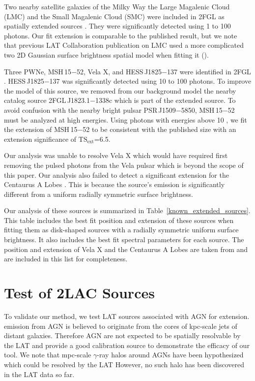 \documentclass[12pt,preprint]{aastex}
\newcommand{\gev}{\text{GeV}\xspace}
\newcommand{\tsext}{{\ensuremath{\text{TS}_{\text{ext}}}}\xspace}
\begin{document}
Two nearby satellite galaxies of the Milky Way the Large Magalenic Cloud (LMC)
and the Small Magalenic
Cloud (SMC) were included in 2FGL as spatially extended sources \citep{lmc,smc}.  They were significantly
detected using 1 \gev to 100 \gev photons. Our
fit extension is comparable to the published result, but we note that
previous LAT Collaboration publication on LMC used a more complicated two 2D Gaussian surface
brightness spatial model when fitting it (\citep{lmc}).

Three PWNe, MSH\,15$-$52, Vela X, and HESS\,J1825$-$137 were
identified in 2FGL \citep{msh1552,velax,fermi_hess_j1825}.  
HESS\,J1825$-$137 was significantly detected using 10 \gev to 100 \gev photons.
To improve the model of this source, we removed from our background model the
nearby catalog source 2FGL\,J1823.1$-$1338c which is part of the extended
source.  To avoid confusion with the nearby bright pulsar PSR\,J1509$-$5850, MSH\,15$-$52 must be
analyzed at high energies.  Using photons with energies above 10 \gev,
we fit the extension of MSH\,15$-$52 to be consistent with the published
size with an extension significance of \tsext=6.5.  

Our analysis was unable to resolve Vela X which would have required first
removing the pulsed photons from the Vela pulsar which is beyond the
scope of this paper.  Our analysis also failed to detect a significant
extension for the Centaurus A Lobes \citep{cen_a_lat}. This is because
the source's emission is significantly different from a uniform
radially symmetric surface brightness.

Our analysis of these sources is summarized in
Table~\ref{known_extended_sources}.  This table includes the best fit
position and extension of these sources when fitting them as disk-shaped
sources with a radially symmetric uniform surface brightness. It also
includes the best fit spectral parameters for each source.  The position
and extension of Vela X and the Centaurus A Lobes are taken from
\cite{velax,cen_a_lat} and are included in this list for completeness.

\section{Test of 2LAC Sources}
\label{test_2lac_sources}

To validate our method, we test LAT sources associated with AGN for
extension.  \gev emission from AGN is believed to originate from the cores
of kpc-scale jets of distant galaxies.  Therefore AGN are not expected
to be spatially resolvable by the LAT and provide a good calibration source to
demonstrate the efficacy of our tool.  We note that mpc-scale $\gamma$-ray
halos around AGNs have been hypothesized \citep{pair_halo_paper} which
could be resolved by the LAT However, no such halo has been discovered
in the LAT data so far.
\end{document}
